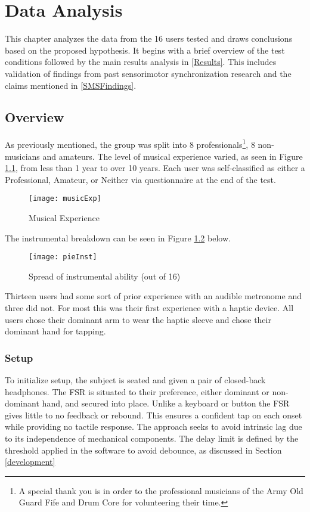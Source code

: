 \chapter{Data Analysis} \label{DataAnalysis}
This chapter analyzes the data from the 16 users tested and draws conclusions based on the proposed hypothesis. It begins with a brief overview of the test conditions followed by the main results analysis in \ref{Results}. This includes validation of findings from past sensorimotor synchronization research and the claims mentioned in \ref{SMSFindings}. 

\section{Overview}
As previously mentioned, the group was split into 8 professionals\footnote{A special thank you is in order to the professional musicians of the Army Old Guard Fife and Drum Core for volunteering their time.}, 8 non-musicians and amateurs. The level of musical experience varied, as seen in Figure \ref{fig:musicExp}, from less than 1 year to over 10 years. Each user was self-classified as either a Professional, Amateur, or Neither via questionnaire at the end of the test.
\begin{figure}[H]\label{fig:musicExp}
    \centering
    \texttt{[image: musicExp]}
    \caption{Musical Experience}
\end{figure}
The instrumental breakdown can be seen in Figure \ref{fig:pieInst} below.
\begin{figure}[H]\label{fig:pieInst}
    \centering
    \texttt{[image: pieInst]}
    \caption{Spread of instrumental ability (out of 16)}
\end{figure}
Thirteen users had some sort of prior experience with an audible metronome and three did not. For most this was their first experience with a haptic device. All users chose their dominant arm to wear the haptic sleeve and chose their dominant hand for tapping.

\subsection{Setup} \label{testSetup}
To initialize setup, the subject is seated and given a pair of closed-back headphones. The FSR is situated to their preference, either dominant or non-dominant hand, and secured into place. Unlike a keyboard or button the FSR gives little to no feedback or rebound. This ensures a confident tap on each onset while providing no tactile response. The approach seeks to avoid intrinsic lag due to its independence of mechanical components. The delay limit is defined by the threshold applied in the software to avoid debounce, as discussed in Section \ref{development}

